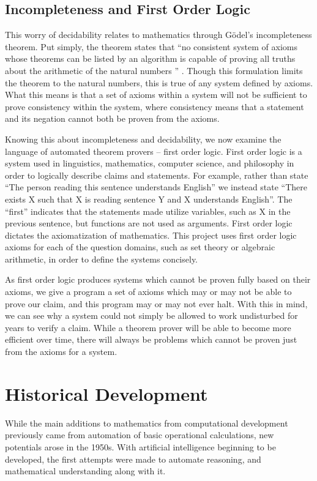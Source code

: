 \subsection{Incompleteness and First Order Logic}
This worry of decidability relates to mathematics through G\"odel's incompleteness theorem. Put simply, the theorem states that ``no consistent system of axioms whose theorems can be listed by an algorithm is capable of proving all truths about the arithmetic of the natural numbers '' \cite{Godel}. Though this formulation limits the theorem to the natural numbers, this is true of any system defined by axioms. What this means is that a set of axioms within a system will not be sufficient to prove consistency within the system, where consistency means that a statement and its negation cannot both be proven from the axioms.

Knowing this about incompleteness and decidability, we now examine the language of automated theorem provers -- first order logic. First order logic is a system used in linguistics, mathematics, computer science, and philosophy in order to logically describe claims and statements. For example, rather than state ``The person reading this sentence understands English'' we instead state ``There exists X such that X is reading sentence Y and X understands English''. The ``first'' indicates that the statements made utilize variables, such as X in the previous sentence, but functions are not used as arguments. First order logic dictates the axiomatization of mathematics. This project uses first order logic axioms for each of the question domains, such as set theory or algebraic arithmetic, in order to define the systems concisely.

As first order logic produces systems which cannot be proven fully based on their axioms, we give a program a set of axioms which may or may not be able to prove our claim, and this program may or may not ever halt. With this in mind, we can see why a system could not simply be allowed to work undisturbed for years to verify a claim. While a theorem prover will be able to become more efficient over time, there will always be problems which cannot be proven just from the axioms for a system.

\section{Historical Development}

While the main additions to mathematics from computational development previously came from automation of basic operational calculations, new potentials arose in the 1950s. With artificial intelligence beginning to be developed, the first attempts were made to automate reasoning, and mathematical understanding along with it.

